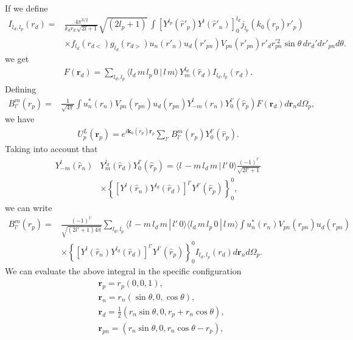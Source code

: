\documentclass[a4paper,11pt]{article}
\begin{document}
 If we define
 \begin{align}\label{eq48}
\nonumber I_{l_d,l_p}(r_d)=&\frac{4\pi^{3/2}}{k_dr_d\,\sqrt{2l+1}}\sqrt{(2l_p+1)}\,  \int  \left[Y^{l_p}(\hat r'_p)Y^{l}(\hat r'_n)\right]^{l_d}_0j_{l_p}(k_0(r_p) r'_p)\\
&\times f_{l_d}(r_{d<})g_{l_d}(r_{d>})u_n(r'_n)u_d(r'_{pn}) V_{pn}(r'_{pn}) r'_dr_{pn}^{'2}\sin\theta\, d r_d'dr'_{pn}d\theta.
 \end{align}
 we get
 \begin{align}\label{eq75}
 F(\mathbf r_d)=\sum_{l_d,l_p} \langle l_d\,m\,l_p\,0\,|\,l\,m\rangle\,Y^{l_d}_m(\hat r_d)I_{l_d,l_p}(r_d).
 \end{align} 
 Defining
 \begin{align}\label{eq54}
  B_{l'}^m(r_p)=
 &\frac{1}{\sqrt{4\pi}}\int u_n^*(r_n)V_{pn}(r_{pn})u_d(r_{pn})  Y^{l}_{-m}(\hat r_n)Y^{l'}_0(\hat r_p)F(\mathbf r_d) d\mathbf r_nd\Omega_p,
 \end{align} 
 we have
 \begin{align}\label{eq53}
  U^L_p(\mathbf r_p)=e^{i\mathbf k_0(r_p)\mathbf r_p}\sum_{l'}B^m_{l'}(r_p)Y_0^{l'}(\hat r_p).
 \end{align}
 Taking into account that
  \begin{align}\label{eq76}
 \nonumber Y^{l}_{-m}(\hat r_n)&Y^{l_d}_m(\hat r_d)Y^{l'}_0(\hat r_p)=\langle l\,-m\,l_d\,m\,|\,l'\,0\rangle\frac{(-1)^{l'}}{\sqrt{2l'+1}}\\
 &\times\left\{\left[Y^{l}(\hat r_n)Y^{l_d}(\hat r_d)\right]^{l'}Y^{l'}(\hat r_p)\right\}^0_0,
  \end{align}
we can write
 \begin{align}\label{eq55}
 \nonumber  B_{l'}^m(r_p)=&\frac{(-1)^{l'}}{\sqrt{(2l'+1)4\pi}}\sum_{l_d,l_p}\langle l\,-m\,l_d\,m\,|\,l'\,0\rangle\langle l_d\,m\,l_p\,0\,|\,l\,m\rangle\int u_n^*(r_n)V_{pn}(r_{pn})u_d(r_{pn})\\
 &\times  \left\{\left[Y^{l}(\hat r_n)Y^{l_d}(\hat r_d)\right]^{l'}Y^{l'}(\hat r_p)\right\}^0_0 I_{l_d,l_p}(r_d)d\mathbf r_nd\Omega_p.
 \end{align}
 We can evaluate the above integral in the specific configuration
 \begin{align}\label{eq77}
 \nonumber&\mathbf r_p=r_p\left(0,0,1\right),\\
 \nonumber&\mathbf r_{n}=r_{n}\left(\sin\theta,0,\cos\theta\right),\\
 \nonumber &\mathbf r_{d}=\frac{1}{2}\left(r_{n}\sin\theta,0,r_p+r_{n}\cos\theta\right),\\
&\mathbf r_{pn}=\left(r_{n}\sin\theta,0,r_{n}\cos\theta-r_p\right),
 \end{align}
\end{document}
